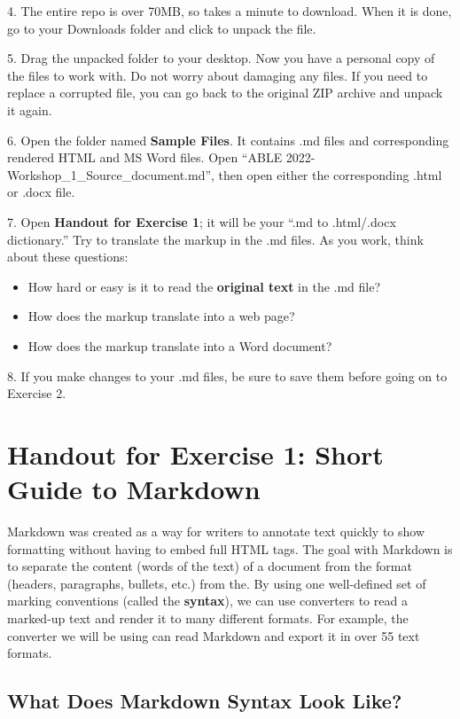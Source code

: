 \documentclass[
]{article}
\providecommand{\tightlist}{%
  \setlength{\itemsep}{0pt}\setlength{\parskip}{0pt}}
\begin{document}
4. The entire repo is over 70MB, so takes a minute to download. When it
is done, go to your Downloads folder and click to unpack the file.

5. Drag the unpacked folder to your desktop. Now you have a personal
copy of the files to work with. Do not worry about damaging any files.
If you need to replace a corrupted file, you can go back to the original
ZIP archive and unpack it again.

6. Open the folder named \textbf{Sample Files}. It contains .md files
and corresponding rendered HTML and MS Word files. Open ``ABLE
2022-Workshop\_1\_Source\_document.md'', then open either the
corresponding .html or .docx file.

7. Open \textbf{Handout for Exercise 1}; it will be your ``.md to
.html/.docx dictionary.'' Try to translate the markup in the .md files.
As you work, think about these questions:

\begin{itemize}
\tightlist
\item
  How hard or easy is it to read the \textbf{original text} in the .md
  file?
\item
  How does the markup translate into a web page?
\item
  How does the markup translate into a Word document?
\end{itemize}

8. If you make changes to your .md files, be sure to save them before
going on to Exercise 2.

\hypertarget{handout-for-exercise-1-short-guide-to-markdown}{%
\section{Handout for Exercise 1: Short Guide to
Markdown}\label{handout-for-exercise-1-short-guide-to-markdown}}

Markdown was created as a way for writers to annotate text quickly to
show formatting without having to embed full HTML tags. The goal with
Markdown is to separate the content (words of the text) of a document
from the format (headers, paragraphs, bullets, etc.) from the. By using
one well-defined set of marking conventions (called the
\textbf{syntax}), we can use converters to read a marked-up text and
render it to many different formats. For example, the converter we will
be using can read Markdown and export it in over 55 text formats.

\hypertarget{what-does-markdown-syntax-look-like}{%
\subsection{What Does Markdown Syntax Look
Like?}\label{what-does-markdown-syntax-look-like}}
\end{document}

